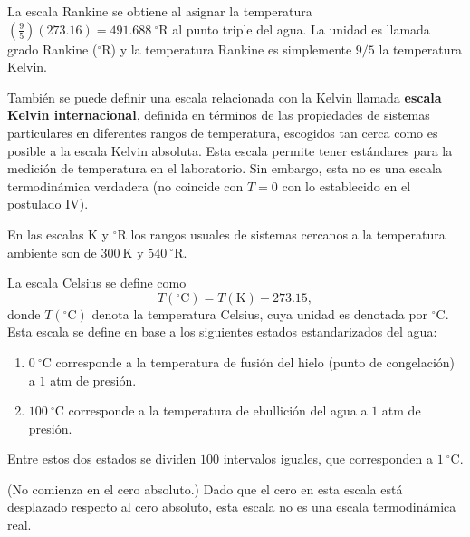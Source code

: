 \begin{definicion}
  La escala Rankine se obtiene al asignar la temperatura
  $\left(\tfrac{9}{5}\right)(273.16)=491.688\ ^{\circ}\mathrm{R}$ al punto triple del agua. La unidad
  es llamada grado Rankine ($^{\circ}\mathrm{R}$) y la temperatura Rankine es simplemente $9/5$ la
  temperatura Kelvin.
\end{definicion}

También se puede definir una escala relacionada con la Kelvin llamada \textbf{escala Kelvin
internacional}, definida en términos de las propiedades de sistemas particulares en diferentes
rangos de temperatura, escogidos tan cerca como es posible a la escala Kelvin absoluta. Esta escala
permite tener estándares para la medición de temperatura en el laboratorio. Sin embargo, esta no es
una escala termodinámica verdadera (no coincide con $T=0$ con lo establecido en el postulado IV).

En las escalas K y $^{\circ}\mathrm{R}$ los rangos usuales de sistemas cercanos a la temperatura
ambiente son de $300\ \mathrm{K}$ y $540\ ^{\circ}\mathrm{R}$.

\begin{definicion}
  La escala Celsius se define como
  \begin{equation*}
    T(^{\circ}\mathrm{C})=T(\mathrm{K})-273.15,
  \end{equation*}
  donde $T(^{\circ}\mathrm{C})$ denota la temperatura Celsius, cuya unidad es denotada por
  $^{\circ}\mathrm{C}$. Esta escala se define en base a los siguientes estados estandarizados del agua:
  \begin{enumerate}[label=\arabic*.,itemsep=0pt]
    \item $0\ ^{\circ}\mathrm{C}$ corresponde a la temperatura de fusión del hielo (punto de
      congelación) a $1$ atm de presión.
    \item $100\ ^{\circ}\mathrm{C}$ corresponde a la temperatura de ebullición del agua a $1$ atm de
      presión.
  \end{enumerate}
  Entre estos dos estados se dividen $100$ intervalos iguales, que corresponden a
  $1\ ^{\circ}\mathrm{C}$.
\end{definicion}

(No comienza en el cero absoluto.) Dado que el cero en esta escala está desplazado respecto al cero
absoluto, esta escala no es una escala termodinámica real.

